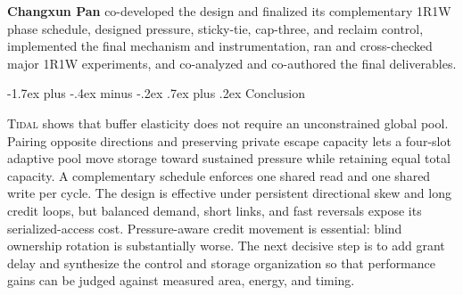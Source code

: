 \documentclass[10pt,twocolumn]{article}
\makeatletter
\newcommand{\system}{\textsc{Tidal}\xspace}
\renewcommand\section{\@startsection{section}{1}{\z@}%
  {-1.7ex plus -.4ex minus -.2ex}%
  {.7ex plus .2ex}%
  {\normalfont\large\bfseries}}
\makeatother
\begin{document}
\textbf{Changxun Pan} co-developed the design and finalized its complementary
1R1W phase schedule, designed pressure, sticky-tie, cap-three, and reclaim control,
implemented the final mechanism and instrumentation, ran and cross-checked
major 1R1W experiments, and co-analyzed and co-authored the final deliverables.

\section{Conclusion}

\system shows that buffer elasticity does not require an unconstrained global
pool. Pairing opposite directions and preserving private escape capacity lets
a four-slot adaptive pool move storage toward sustained pressure while
retaining equal total capacity. A complementary schedule enforces one shared
read and one shared write per cycle. The design is effective under persistent
directional skew and long credit loops, but balanced demand, short links, and
fast reversals expose its serialized-access cost. Pressure-aware credit
movement is essential: blind ownership rotation is substantially worse. The
next decisive step is to add grant delay and synthesize the control and
storage organization so that performance gains can be judged against measured
area, energy, and timing.

{\small


}
\end{document}
